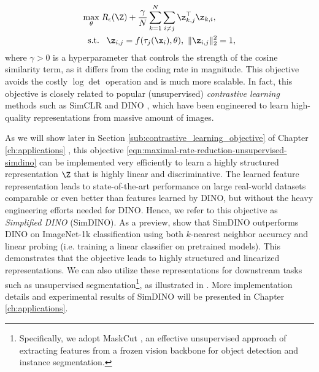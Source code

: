 \documentclass[../../book-main.tex]{subfiles}
\begin{document}
\begin{equation}
	\begin{aligned}
		\max_{\theta } & \;  R_{\epsilon}(\Z) + \frac{\gamma}{N}\sum_{k=1}^N \sum_{i \neq j} \z_{k,j}^\top \z_{k,i}, \\
		\mbox{s.t.} &  \ \ \, \z_{i,j} = f(\tau_j(\x_i),\theta),\  \|\z_{i,j}\|_2^2                                          = 1, 
	\end{aligned}
	\label{eqn:maximal-rate-reduction-unsupervised-simdino}
\end{equation}
where $\gamma > 0$ is a hyperparameter that controls the strength of the cosine similarity term, as it differs from the coding rate in magnitude. This objective avoids the costly $\log \det$ operation and is much more scalable. In fact, this objective is closely related to popular (unsupervised) {\em contrastive learning} methods such as SimCLR \cite{chen2020simple} and DINO \cite{caron2021emerging}, which have been engineered to learn high-quality representations from massive amount of images. 

As we will show later in Section \ref{sub:contrastive_learning_objective} of Chapter \ref{ch:applications} , this objective \eqref{eqn:maximal-rate-reduction-unsupervised-simdino} can be implemented very efficiently to learn a highly structured  representation $\Z$ that is highly linear and discriminative. 
The learned feature representation leads to state-of-the-art performance on large real-world datasets comparable or even better than features learned by DINO, but without the heavy engineering efforts needed for DINO. Hence, we refer to this objective as {\em Simplified DINO} (SimDINO). As a preview,  show that SimDINO outperforms DINO on ImageNet-1k classification using both \(k\)-nearest neighbor accuracy and linear probing (i.e. training a linear classifier on pretrained models). This demonstrates that the objective leads to highly structured and linearized representations. We can also utilize these representations for downstream tasks such as unsupervised segmentation\footnote{Specifically, we adopt MaskCut \cite{wang2023cut}, an effective unsupervised approach of extracting features from a frozen vision backbone for object detection and instance segmentation.}, as illustrated in . More implementation details and experimental results of SimDINO will be presented in Chapter \ref{ch:applications}.
\end{document}

